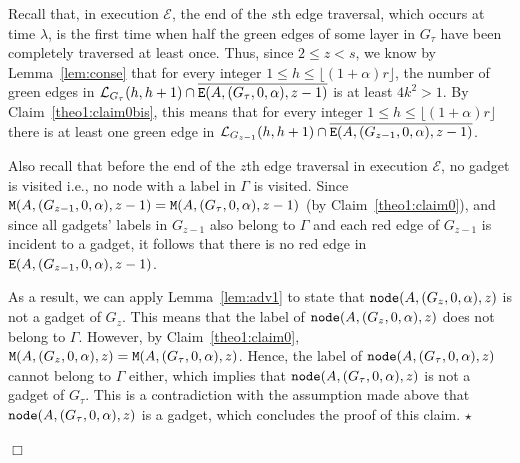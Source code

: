 \documentclass[11pt]{article}
\newcommand{\qed}{\hfill $\Box$ \bigbreak}
\newenvironment{proof}{\noindent {\bf Proof.}}{\qed}
\newenvironment{proofclaim}{\noindent{\bf Proof of the claim.}}{\hfill$\star$}
\begin{document}
{\begin{proof}
\begin{proofclaim}
Recall that, in execution $\mathcal{E}$, the end of the $s$th edge traversal, which occurs at time $\lambda$, is the first time when half the green edges of some layer in $G_{\tau}$ have been completely traversed at least once. Thus, since $2\leq z<s$, we know by Lemma~\ref{lem:conse} that for every integer $1\leq h \leq  \lfloor(1+\alpha)r\rfloor$, the number of green edges in $\mathcal{L}_{G_{\tau}}(h,h+1)\cap\overline{{\tt E}(A,(G_{\tau},0,\alpha),z-1)}$ is at least $4k^2>1$. By Claim~\ref{theo1:claim0bis}, this means that for every integer $1\leq h \leq  \lfloor(1+\alpha)r\rfloor$ there is at least one green edge in $\mathcal{L}_{G_{z-1}}(h,h+1)\cap\overline{{\tt E}(A,(G_{z-1},0,\alpha),z-1)}$. 

Also recall that before the end of the $z$th edge traversal in execution $\mathcal{E}$, no gadget is visited i.e., no node with a label in $\Gamma$ is visited. Since ${\tt M}(A,(G_{z-1},0,\alpha),z-1)={\tt M}(A,(G_\tau,0,\alpha),z-1)$ (by Claim~\ref{theo1:claim0}), and since all gadgets' labels in $G_{z-1}$ also belong to $\Gamma$ and each red edge of $G_{z-1}$ is incident to a gadget, it follows that there is no red edge in ${\tt E}(A,(G_{z-1},0,\alpha),z-1)$.

As a result, we can apply Lemma~\ref{lem:adv1} to state that ${\tt node}(A,(G_z,0,\alpha),z)$ is not a gadget of $G_z$. This means that the label of ${\tt node}(A,(G_z,0,\alpha),z)$ does not belong to $\Gamma$. However, by Claim~\ref{theo1:claim0}, ${\tt M}(A,(G_z,0,\alpha),z)={\tt M}(A,(G_\tau,0,\alpha),z)$. Hence, the label of ${\tt node}(A,(G_{\tau},0,\alpha),z)$ cannot belong to $\Gamma$ either, which implies that ${\tt node}(A,(G_{\tau},0,\alpha),z)$ is not a gadget of $G_{\tau}$. This is a contradiction with the assumption made above that ${\tt node}(A,(G_{\tau},0,\alpha),z)$ is a gadget, which concludes the proof of this claim.
\end{proofclaim}


\end{proof}}
\end{document}
